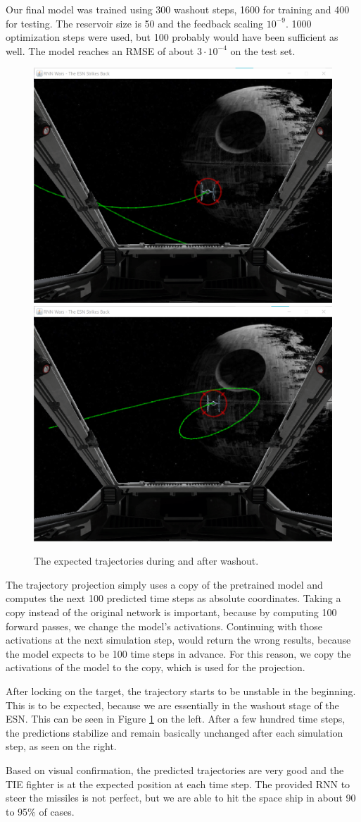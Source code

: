 Our final model was trained using 300 washout steps, 1600 for training and 400 for testing. The reservoir size is 50 and the feedback scaling $10^{-9}$. 1000 optimization steps were used, but 100 probably would have been sufficient as well. The model reaches an RMSE of about $3\cdot 10^{-4}$ on the test set. 

\begin{figure}[b]
	\centering
	\includegraphics[width=0.475\linewidth]{washout}%
	\hfill
	\includegraphics[width=0.475\linewidth]{trajectory}
	\caption{The expected trajectories during and after washout.}
	\label{img:trajectory}
\end{figure}


The trajectory projection simply uses a copy of the pretrained model and computes the next 100 predicted time steps as absolute coordinates. Taking a copy instead of the original network is important, because by computing 100 forward passes, we change the model's activations. Continuing with those activations at the next simulation step, would return the wrong results, because the model expects to be 100 time steps in advance. For this reason, we copy the activations of the model to the copy, which is used for the projection.

After locking on the target, the trajectory starts to be unstable in the beginning. This is to be expected, because we are essentially in the washout stage of the ESN. This can be seen in Figure \ref{img:trajectory} on the left. After a few hundred time steps, the predictions stabilize and remain basically unchanged after each simulation step, as seen on the right. 

Based on visual confirmation, the predicted trajectories are very good and the TIE fighter is at the expected position at each time step. The provided RNN to steer the missiles is not perfect, but we are able to hit the space ship in about 90 to 95\% of cases.


